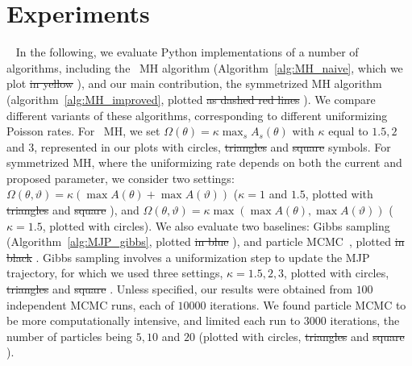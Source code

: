 \section{Experiments}\label{sec:expts}~
In the following, we evaluate Python implementations of a number of algorithms, including the \naive\ MH algorithm (Algorithm~\ref{alg:MH_naive}, which we plot \sout{in yellow} ), and our main contribution, the symmetrized MH algorithm (algorithm~\ref{alg:MH_improved}, plotted \sout{as dashed red lines}
). 
We compare different variants of these algorithms, corresponding to different uniformizing Poisson rates. %
For \naive\ MH, we set $\Omega(\theta) = \kappa \max_s A_s(\theta) $ with $\kappa$  equal to $1.5, 2$ and $3$, represented in our plots with circles, \sout{triangles}  and \sout{square}  symbols. 
For symmetrized MH, where the uniformizing rate depends on both the current and proposed parameter, we consider two settings:
 $\Omega(\theta, \vartheta) = \kappa (\max A(\theta) + \max A(\vartheta))$ 
 ($\kappa = 1$ and $1.5$, plotted with \sout{triangles}  and \sout{square} ), and 
$\Omega(\theta, \vartheta) = \kappa \max(\max A(\theta), \max A(\vartheta))$
($\kappa=1.5$, plotted with {circles}).  
We also evaluate two baselines: Gibbs sampling (Algorithm~\ref{alg:MJP_gibbs}, plotted \sout{in blue}  ), and particle MCMC~\citep{Andrieu10}, plotted \sout{in black} . Gibbs sampling involves a uniformization step to update the MJP trajectory, for which we used three settings, $\kappa=1.5,2,3$, plotted with circles, \sout{triangles}  and \sout{square} .  
Unless specified, our results were obtained from $100$ independent MCMC runs, each of $10000$ iterations.
We found particle MCMC to be more computationally intensive, and limited each run to $3000$ iterations, the number of particles being $5, 10$ and $20$ (plotted with circles, \sout{triangles}  and \sout{square} ). 



